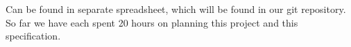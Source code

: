 \documentclass[12pt,a4paper]{article}
\begin{document}
Can be found in separate spreadsheet, which will be found in our git repository.
So far we have each spent 20 hours on planning this project and this specification.


\end{document}
